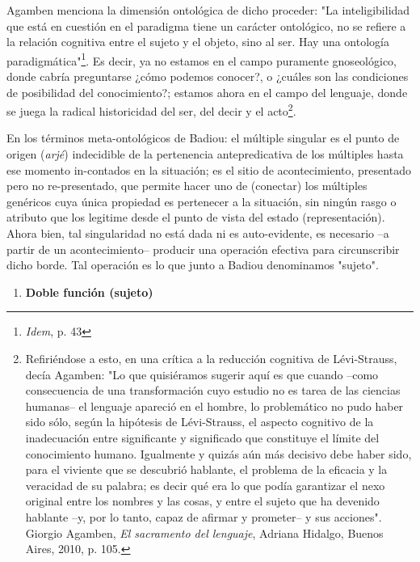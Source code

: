 \documentclass{book}
\begin{document}
Agamben menciona la dimensión ontológica de dicho proceder: "La
inteligibilidad que está en cuestión en el paradigma tiene un carácter
ontológico, no se refiere a la relación cognitiva entre el sujeto y el
objeto, sino al ser. Hay una ontología paradigmática"\footnote{\emph{Idem},
  p. 43}. Es decir, ya no estamos en el campo puramente gnoseológico,
donde cabría preguntarse ¿cómo podemos conocer?, o ¿cuáles son las
condiciones de posibilidad del conocimiento?; estamos ahora en el campo
del lenguaje, donde se juega la radical historicidad del ser, del decir
y el acto\footnote{Refiriéndose a esto, en una crítica a la reducción
  cognitiva de Lévi-Strauss, decía Agamben: "Lo que quisiéramos sugerir
  aquí es que cuando --como consecuencia de una transformación cuyo
  estudio no es tarea de las ciencias humanas-- el lenguaje apareció en
  el hombre, lo problemático no pudo haber sido sólo, según la hipótesis
  de Lévi-Strauss, el aspecto cognitivo de la inadecuación entre
  significante y significado que constituye el límite del conocimiento
  humano. Igualmente y quizás aún más decisivo debe haber sido, para el
  viviente que se descubrió hablante, el problema de la eficacia y la
  veracidad de su palabra; es decir qué era lo que podía garantizar el
  nexo original entre los nombres y las cosas, y entre el sujeto que ha
  devenido hablante --y, por lo tanto, capaz de afirmar y prometer-- y
  sus acciones". Giorgio Agamben, \emph{El sacramento del lenguaje},
  Adriana Hidalgo, Buenos Aires, 2010, p. 105.}.

En los términos meta-ontológicos de Badiou: el múltiple singular es el
punto de origen (\emph{arjé}) indecidible de la pertenencia
antepredicativa de los múltiples hasta ese momento in-contados en la
situación; es el sitio de acontecimiento, presentado pero no
re-presentado, que permite hacer uno de (conectar) los múltiples
genéricos cuya única propiedad es pertenecer a la situación, sin ningún
rasgo o atributo que los legitime desde el punto de vista del estado
(representación). Ahora bien, tal singularidad no está dada ni es
auto-evidente, es necesario --a partir de un acontecimiento-- producir
una operación efectiva para circunscribir dicho borde. Tal operación es
lo que junto a Badiou denominamos "sujeto".

\begin{enumerate}
\def\labelenumi{\arabic{enumi}.}
\setcounter{enumi}{1}
\item
  \textbf{Doble función (sujeto)}
\end{enumerate}
\end{document}
